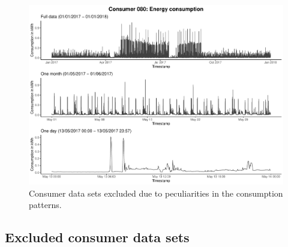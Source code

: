\begin{centering}
\begin{figure}[!htbp]
        \includegraphics[width=\textwidth-0.85cm]{thesis/graphs/timeseries/c080_cons.pdf}
        \caption[Consumer data sets excluded due to peculiarities in the consumption patterns]{Consumer data sets excluded due to peculiarities in the consumption patterns. \quantnet}
        \label{App:Fig:excludedcons}
\end{figure}
\end{centering}


\subsection{Excluded consumer data sets}\label{App:Figures:Excludedp}

